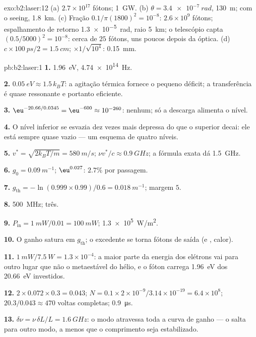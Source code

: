 \begin{solution}{exo:b2:laser:12}
(a) $2.7 \times 10^{17}$ fótons; \qty{1}{GW}. (b) $\theta = \qty{3.4e-7}{rad}$,
\qty{130}{m}; com o seeing, \qty{1.8}{km}. (c) Fração $0.1/\pi(1800)^2 =
10^{-8}$: $2.6 \times 10^9$ fótons; espalhamento de retorno \qty{1.3e-5}{rad}, raio
\qty{5}{km}; o telescópio capta $(0.5/5000)^2 = 10^{-8}$: cerca de $25$
fótons, uns poucos depois da óptica. (d) $c \times \qty{100}{ps}/2 = \qty{1.5}{cm}$;
$\times 1/\sqrt{10^4}$: \qty{0.15}{mm}.
\end{solution}

\begin{solution}{pb:b2:laser:1}
\textbf{1.} \qty{1.96}{eV}, \qty{4.74e14}{Hz}.

\textbf{2.} $\qty{0.05}{eV} \approx 1.5\,k_BT$: a agitação térmica fornece
o pequeno déficit; a transferência é quase ressonante e portanto eficiente.

\textbf{3.} $\eu^{-20.66/0.0345} = \eu^{-600} \approx 10^{-260}$: nenhum; só a
descarga alimenta o nível.

\textbf{4.} O nível inferior se esvazia dez vezes mais depressa do que o superior
decai: ele está sempre quase vazio --- um esquema de quatro níveis.

\textbf{5.} $v^* = \sqrt{2k_BT/m} = \qty{580}{m/s}$; $\nu v^*/c \approx \qty{0.9}{GHz}$;
a fórmula exata dá \qty{1.5}{GHz}.

\textbf{6.} $g_0 = \qty{0.09}{m^{-1}}$; $\eu^{0.027}$: $2.7\%$ por passagem.

\textbf{7.} $g_{\text{th}} = -\ln(0.999 \times 0.99)/0.6 = \qty{0.018}{m^{-1}}$;
margem $5$.

\textbf{8.} \qty{500}{MHz}; três.

\textbf{9.} $P_{\text{in}} = \qty{1}{mW}/0.01 = \qty{100}{mW}$; \qty{1.3e5}{W/m^2}.

\textbf{10.} O ganho satura em $g_{\text{th}}$; o excedente se torna
fótons de saída (e , calor).

\textbf{11.} $\qty{1}{mW}/\qty{7.5}{W} = 1.3 \times 10^{-4}$: a maior parte da
energia dos elétrons vai para outro lugar que não o metaestável do hélio, e o
fóton carrega \qty{1.96}{eV} dos \qty{20.66}{eV} investidos.

\textbf{12.} $2 \times 0.072 \times 0.3 = 0.043$; $N = 0.1 \times 2 \times 10^{-9}/3.14
\times 10^{-19} = 6.4 \times 10^8$; $20.3/0.043 \approx 470$ voltas completas;
\qty{0.9}{\micro s}.

\textbf{13.} $\delta\nu = \nu\,\delta L/L = \qty{1.6}{GHz}$: o modo atravessa
toda a curva de ganho --- o  salta para outro modo, a menos que o comprimento seja
estabilizado.


\end{solution}
